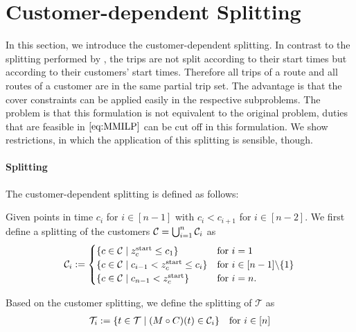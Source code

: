 
\section{Customer-dependent Splitting}
\label{sec:customer_dependent_splitting}

In this section, we introduce the customer-dependent splitting. In contrast to the splitting performed by \cite{Knoll}, the trips are not split according to their start times but according to their customers' start times. Therefore all trips of a route and all routes of a customer are in the same partial trip set. The advantage is that the cover constraints can be applied easily in the respective subproblems. The problem is that this formulation is not equivalent to the original problem, \ie duties that are feasible in $\eqref{eq:MMILP}$ can be cut off in this formulation. We show restrictions, in which the application of this splitting is sensible, though. 

\paragraph{Splitting} \parfill

The customer-dependent splitting is defined as follows:

\begin{definition}
\label{def:customer_dependent_splitting}

Given points in time $c_i$ for $i\in[n-1]$ with $c_i<c_{i+1}$ for $i\in[n-2]$. We first define a splitting of the customers $\mathcal{C}=\bigcup_{i=1}^n\mathcal{C}_i$ as
\begin{align*}
	\mathcal{C}_i := \begin{cases}
		\left\{c\in\mathcal{C}\mid z^{\operatorname{start}}_c\leq c_1\right\} & \text{for } i=1 \\
		\left\{c\in\mathcal{C}\mid c_{i-1}<z^{\operatorname{start}}_c\leq c_i\right\} & \text{for } i\in[n-1]\backslash\{1\} \\
		\left\{c\in\mathcal{C}\mid c_{n-1}<z^{\operatorname{start}}_c\right\} & \text{for } i=n.
	\end{cases}
\end{align*}

Based on the customer splitting, we define the splitting of $\mathcal{T}$ as
\begin{align*}
	\mathcal{T}_i := \left\{t\in\mathcal{T}\mid (M\circ C)(t)\in\mathcal{C}_i\right\} && \text{for } i\in[n]
\end{align*}

\end{definition}

